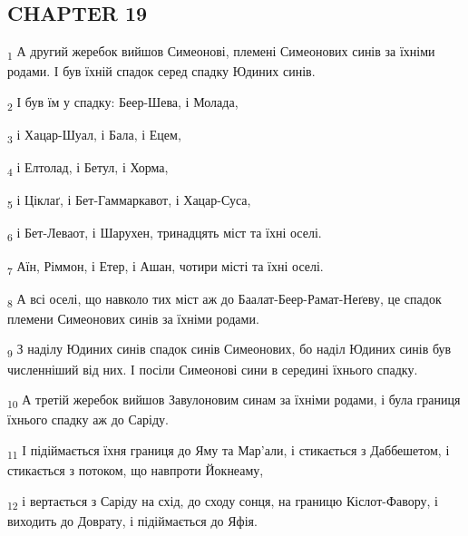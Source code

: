 \subsection{CHAPTER 19}
\begin{tcolorbox}
\textsubscript{1} А другий жеребок вийшов Симеонові, племені Симеонових синів за їхніми родами. І був їхній спадок серед спадку Юдиних синів.
\end{tcolorbox}
\begin{tcolorbox}
\textsubscript{2} І був їм у спадку: Беер-Шева, і Молада,
\end{tcolorbox}
\begin{tcolorbox}
\textsubscript{3} і Хацар-Шуал, і Бала, і Ецем,
\end{tcolorbox}
\begin{tcolorbox}
\textsubscript{4} і Елтолад, і Бетул, і Хорма,
\end{tcolorbox}
\begin{tcolorbox}
\textsubscript{5} і Ціклаґ, і Бет-Гаммаркавот, і Хацар-Суса,
\end{tcolorbox}
\begin{tcolorbox}
\textsubscript{6} і Бет-Леваот, і Шарухен, тринадцять міст та їхні оселі.
\end{tcolorbox}
\begin{tcolorbox}
\textsubscript{7} Аїн, Ріммон, і Етер, і Ашан, чотири місті та їхні оселі.
\end{tcolorbox}
\begin{tcolorbox}
\textsubscript{8} А всі оселі, що навколо тих міст аж до Баалат-Беер-Рамат-Неґеву, це спадок племени Симеонових синів за їхніми родами.
\end{tcolorbox}
\begin{tcolorbox}
\textsubscript{9} З наділу Юдиних синів спадок синів Симеонових, бо наділ Юдиних синів був численніший від них. І посіли Симеонові сини в середині їхнього спадку.
\end{tcolorbox}
\begin{tcolorbox}
\textsubscript{10} А третій жеребок вийшов Завулоновим синам за їхніми родами, і була границя їхнього спадку аж до Саріду.
\end{tcolorbox}
\begin{tcolorbox}
\textsubscript{11} І підіймається їхня границя до Яму та Мар'али, і стикається з Даббешетом, і стикається з потоком, що навпроти Йокнеаму,
\end{tcolorbox}
\begin{tcolorbox}
\textsubscript{12} і вертається з Саріду на схід, до сходу сонця, на границю Кіслот-Фавору, і виходить до Доврату, і підіймається до Яфія.
\end{tcolorbox}
